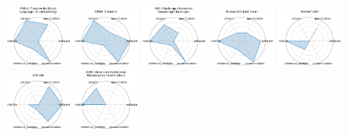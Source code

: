 
\begin{figure}[ht!]
\centering
\includegraphics[width=0.1900\textwidth]{images/mmlu_massive_multitask_language_understanding_radar.pdf}
\includegraphics[width=0.1900\textwidth]{images/gpqa_diamond_radar.pdf}
\includegraphics[width=0.1900\textwidth]{images/arc-challenge_advanced_reasoning_challenge_radar.pdf}
\includegraphics[width=0.1900\textwidth]{images/humanitys_last_exam_radar.pdf}
\includegraphics[width=0.1900\textwidth]{images/frontiermath_radar.pdf}
\\[1ex]
\includegraphics[width=0.1900\textwidth]{images/scicode_radar.pdf}
\includegraphics[width=0.1900\textwidth]{images/aime_american_invitational_mathematics_examination_radar.pdf}

\end{figure}
